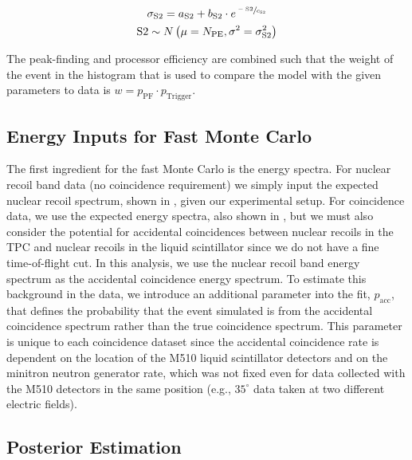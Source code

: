 \begin{equation}
        \label{eqn:nerix_s2_smearing}
        \begin{gathered}
                \sigma_{\textrm{S2}} = a_{\textrm{S2}} + b_{\textrm{S2}} \cdot e^{\sfrac{-\textrm{S2}}{c_{\textrm{S2}}}} \\
                \textrm{S2} \sim N \left( \mu = N_{\textrm{PE}}, \sigma^2  = \sigma_{\textrm{S2}}^2 \right)
        \end{gathered}
\end{equation}


The peak-finding and processor efficiency are combined such that the weight of the event in the histogram that is used to compare the model with the given parameters to data is $w = p_{\textrm{PF}} \cdot p_{\textrm{Trigger}}$.



\subsection{Energy Inputs for Fast Monte Carlo}


The first ingredient for the fast Monte Carlo is the energy spectra.  For nuclear recoil band data (no coincidence requirement) we simply input the expected nuclear recoil spectrum, shown in , given our experimental setup.  For coincidence data, we use the expected energy spectra, also shown in , but we must also consider the potential for accidental coincidences between nuclear recoils in the TPC and nuclear recoils in the liquid scintillator since we do not have a fine time-of-flight cut.  In this analysis, we use the nuclear recoil band energy spectrum as the accidental coincidence energy spectrum.  To estimate this background in the data, we introduce an additional parameter into the fit, $p_{\textrm{acc}}$, that defines the probability that the event simulated is from the accidental coincidence spectrum rather than the true coincidence spectrum.  This parameter is unique to each coincidence dataset since the accidental coincidence rate is dependent on the location of the M510 liquid scintillator detectors and on the minitron neutron generator rate, which was not fixed even for data collected with the M510 detectors in the same position (e.g., $35^{\circ}$ data taken at two different electric fields).



\subsection{Posterior Estimation}


